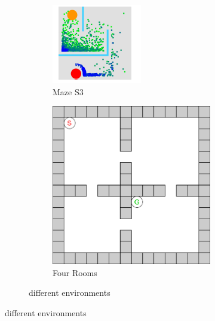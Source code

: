 \documentclass[bibliography=totoc]{scrartcl}
\begin{document}
\begin{figure}[H]
\begin{figure}[H]
	\centering
	\begin{subfigure}[b]{0.3\linewidth}
		\includegraphics[width=\linewidth]{img/Maze_s3.png}
        \caption{Maze S3}	
    \end{subfigure}
	\hspace{0.02\textwidth}
	\begin{subfigure}[b]{0.3\linewidth}
		\includegraphics[width=\linewidth]{img/Four_Rooms.png}
		\caption{Four Rooms}
	\end{subfigure}
 	\caption{different environments}
	\label{fig:differentenvironments}
\end{figure}


\end{figure}
\end{document}

